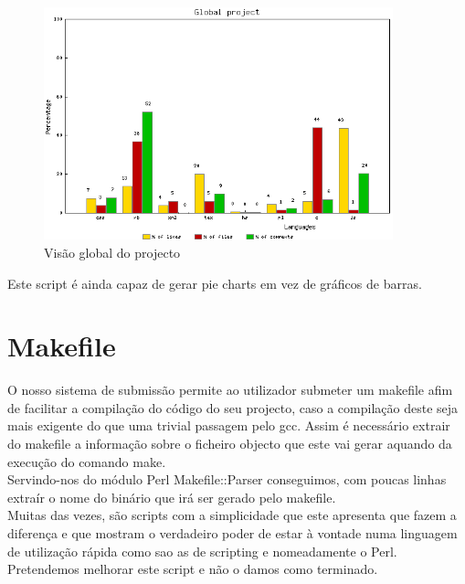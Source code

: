 \begin{figure}[htbp]
\begin{center}
\includegraphics[width=0.9\textwidth]{Images/projecto_projectLanguages.png}
\caption{Visão global do projecto}\label{fig:projectlanguages}
\end{center}
\end{figure}

Este script é ainda capaz de gerar pie charts em vez de gráficos de barras.

\section{Makefile}
O nosso sistema de submissão permite ao utilizador submeter um \textrm{makefile} afim de facilitar a compilação do código do seu
projecto, caso a compilação deste seja mais
exigente do que uma trivial passagem pelo \textrm{gcc}. Assim é necessário extrair do \textrm{makefile} a informação sobre o ficheiro
objecto que este vai gerar aquando da
execução do comando \textrm{make}.\\
Servindo-nos do módulo \textrm{Perl} \textrm{Makefile::Parser} conseguimos, com poucas linhas extraír o nome do binário que irá ser
gerado pelo \textrm{makefile}.\\

Muitas das vezes, são scripts com a simplicidade que este apresenta que fazem a diferença e que mostram o verdadeiro poder de estar à
vontade numa linguagem de utilização rápida como sao as de scripting e nomeadamente o \textrm{Perl}.\\

Pretendemos melhorar este script e não o damos como terminado.
